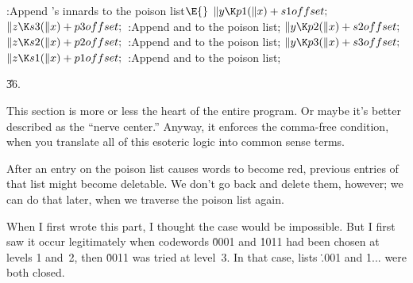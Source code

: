 \B{}:Append 's innards to the poison
list\X${}\E{}$\6
$\|y\K\\{p1}(\|x)+\\{s1offset};{}$\6
${}\|z\K\\{s3}(\|x)+\\{p3offset};{}$\6
:Append  and  to the poison list\X;\6
${}\|y\K\\{p2}(\|x)+\\{s2offset};{}$\6
${}\|z\K\\{s2}(\|x)+\\{p2offset};{}$\6
:Append  and  to the poison list\X;\6
${}\|y\K\\{p3}(\|x)+\\{s3offset};{}$\6
${}\|z\K\\{s1}(\|x)+\\{p1offset};{}$\6
:Append  and  to the poison list\X;\par
\U36.\fi

This section is more or less the heart of the
entire program.
Or maybe it's better described as the ``nerve center.'' Anyway,
it enforces the comma-free condition, when you translate all of
this esoteric logic into common sense terms.

After an entry on the poison list causes words to become red, previous
entries of that list might become deletable. We don't go back and delete
them, however; we can do that later, when we traverse the poison list again.

When I first wrote this part, I thought the case 
would be
impossible. But I first saw it occur legitimately when codewords \.{0001}
and \.{1011} had been chosen at levels 1 and~2, then \.{0011} was tried
at level~3. In that case, lists \.{.001} and \.{1...} were both closed.

